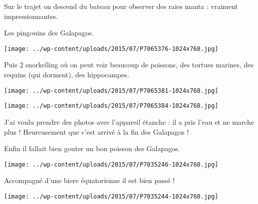  Sur le trajet on descend du bateau pour observer des raies manta : vraiment impressionnantes. 

 Les pingouins des Galapagos. 

 

\begin{center} \texttt{[image: ../wp-content/uploads/2015/07/P7065376-1024x768.jpg]} \end{center}

 

 Puis 2 snorkelling où on peut voir beaucoup de poissons, des tortues marines, des requins (qui dorment), des hippocampes. 

 

\begin{center} \texttt{[image: ../wp-content/uploads/2015/07/P7065381-1024x768.jpg]} \end{center}

 

 

\begin{center} \texttt{[image: ../wp-content/uploads/2015/07/P7065384-1024x768.jpg]} \end{center}

 

 J'ai voulu prendre des photos avec l'appareil étanche : il a pris l'eau et ne marche plus ! Heureusement que c'est arrivé à la fin des Galapagos !

 Enfin il fallait bien gouter un bon poisson des Galapagos. 

 

\begin{center} \texttt{[image: ../wp-content/uploads/2015/07/P7035246-1024x768.jpg]} \end{center}

 

 Accompagné d'une biere équatorienne il est bien passé ! 

 

\begin{center} \texttt{[image: ../wp-content/uploads/2015/07/P7035244-1024x768.jpg]} \end{center}




 
 
